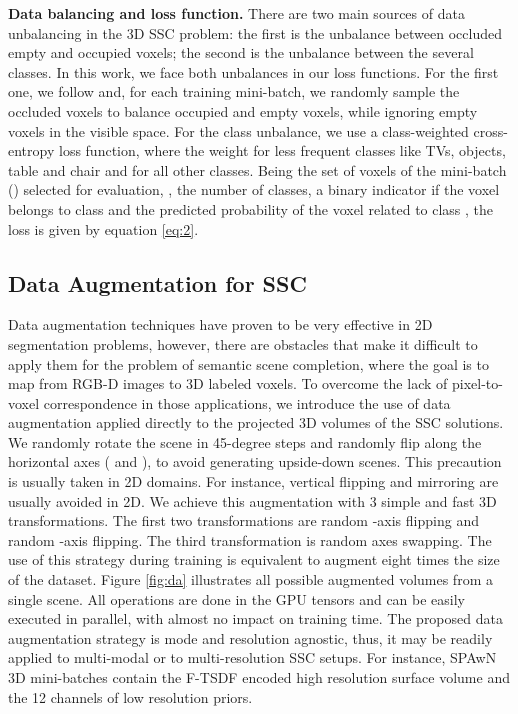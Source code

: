 \textbf{Data balancing and loss function.}
There are two main sources of data unbalancing in the 3D SSC problem: the first is the unbalance between occluded empty and occupied voxels; the second is the unbalance between the several classes. In this work, we face both unbalances in our loss functions. For the first one, we follow \cite{edgnet} and, for each training mini-batch, we randomly sample the occluded voxels to balance occupied and empty voxels, while ignoring empty voxels in the visible space. For the class unbalance, we use a class-weighted cross-entropy loss function, where the weight  for less frequent classes like TVs, objects, table and chair and  for all other classes.
Being  the set of voxels of the mini-batch () selected for evaluation, ,
 the number of classes,  a binary indicator if the voxel  belongs to class  and  the predicted probability of the
voxel  related to class , the loss  is given by equation \ref{eq:2}.



\subsection{Data Augmentation for SSC}
Data augmentation techniques have proven to be very effective in 2D segmentation problems, however, there are obstacles that make it difficult to apply them for the problem of  semantic scene completion, where the goal is to map from RGB-D images to 3D labeled voxels. 
To overcome the lack of pixel-to-voxel correspondence in those applications, 
we introduce the use of data augmentation applied directly to the projected 3D volumes of the SSC solutions. We randomly rotate the scene in 45-degree steps and randomly flip along the horizontal axes ( and ), to avoid generating upside-down scenes. This precaution is usually taken in 2D domains. For instance, vertical flipping and mirroring are usually avoided in 2D.  We achieve this augmentation with 3 simple and fast 3D transformations. The first two transformations are random -axis flipping and random -axis flipping. The third transformation is random  axes swapping.
The use of this strategy during training is equivalent to augment eight times the size of the dataset. Figure \ref{fig:da} illustrates all possible augmented volumes from a single scene.  All operations are done in the GPU tensors and can be easily executed in parallel, with almost no impact on training time. The proposed data augmentation strategy is mode and resolution agnostic, thus, it may be readily applied to multi-modal or to multi-resolution SSC setups. For instance, SPAwN 3D mini-batches contain the F-TSDF encoded high resolution surface volume and the 12 channels of low resolution priors.  



